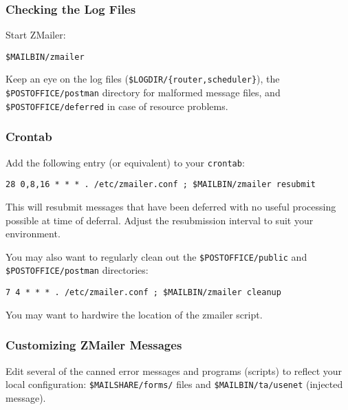 \subsubsection{Checking the Log Files}

Start ZMailer:
\begin{tscreen}
\begin{verbatim}
$MAILBIN/zmailer
\end{verbatim}
\end{tscreen}


Keep an eye on the log files ({\tt \$LOGDIR/\{router,scheduler\}}),
the {\tt \$POSTOFFICE/postman} directory for malformed message files,
and {\tt \$POSTOFFICE/deferred} in case of resource problems.




\subsubsection{Crontab}

Add the following entry (or equivalent) to your {\tt crontab}:
\begin{tscreen}
\begin{verbatim}
28 0,8,16 * * * . /etc/zmailer.conf ; $MAILBIN/zmailer resubmit
\end{verbatim}
\end{tscreen}

This will resubmit messages that have been deferred with no
useful processing possible at time of deferral.  Adjust the
resubmission interval to suit your environment.

You may also want to regularly clean out the {\tt \$POSTOFFICE/public}
and {\tt \$POSTOFFICE/postman} directories:
\begin{tscreen}
\begin{verbatim}
7 4 * * * . /etc/zmailer.conf ; $MAILBIN/zmailer cleanup
\end{verbatim}
\end{tscreen}

You may want to hardwire the location of the zmailer script.




\subsubsection{Customizing ZMailer Messages}

Edit several of the canned error messages and programs (scripts)
to reflect your local configuration: {\tt \$MAILSHARE/forms/} files and
{\tt \$MAILBIN/ta/usenet} (injected message).




